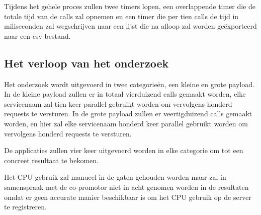 Tijdens het gehele proces zullen twee timers lopen, een overlappende timer die de totale tijd van de calls zal opnemen en een timer die per tien calls de tijd in miliseconden zal wegschrijven naar een lijst die na afloop zal worden geëxporteerd naar een csv bestand.

\subsection{Het verloop van het onderzoek}
\label{subsec:Het verloop van het onderzoek}

Het onderzoek wordt uitgevoerd in twee categorieën, een kleine en grote payload. In de kleine payload zullen er in totaal vierduizend calls gemaakt worden, elke servicenaam zal tien keer parallel gebruikt worden om vervolgens honderd requests te versturen. In de grote payload zullen er veertigduizend calls gemaakt worden, en hier zal elke servicenaam honderd keer parallel gebruikt worden om vervolgens honderd requests te versturen.

De applicaties zullen vier keer uitgevoerd worden in elke categorie om tot een concreet resultaat te bekomen.

Het CPU gebruik zal manueel in de gaten gehouden worden maar zal in samenspraak met de co-promotor niet in acht genomen worden in de resultaten omdat er geen accurate manier beschikbaar is om het CPU gebruik op de server te registreren.

